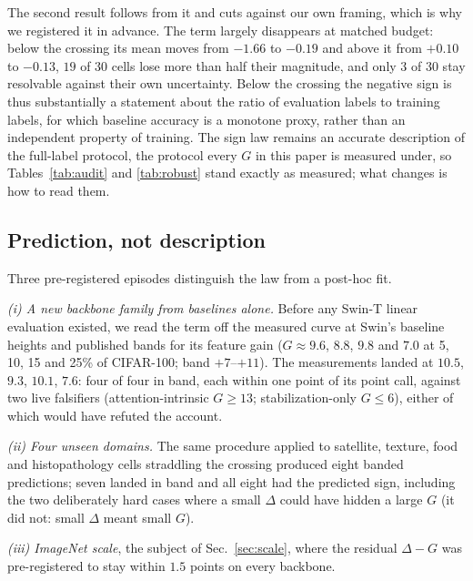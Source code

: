 The second result follows from it and cuts against our own framing, which is
why we registered it in advance. The \readout{} term largely disappears at matched
budget: below the crossing its mean moves from $-1.66$ to $-0.19$ and above it
from $+0.10$ to $-0.13$, $19$ of $30$ cells lose more than half their
magnitude, and only $3$ of $30$ stay resolvable against their own uncertainty.
Below the crossing the negative sign is thus substantially a statement about
the ratio of evaluation labels to training labels, for which baseline accuracy
is a monotone proxy, rather than an independent property of training. The sign
law remains an accurate description of the full-label protocol, the protocol
every $G$ in this paper is measured under, so Tables~\ref{tab:audit} and
\ref{tab:robust} stand exactly as measured; what changes is how to read them.

\subsection{Prediction, not description}\label{sec:lawpredict}
Three pre-registered episodes distinguish the law from a post-hoc fit.

\emph{(i) A new backbone family from baselines alone.} Before any Swin-T linear
evaluation existed, we read the \readout{} term off the measured curve at Swin's
baseline heights and published bands for its feature gain ($G \approx 9.6$,
$8.8$, $9.8$ and $7.0$ at 5, 10, 15 and 25\% of CIFAR-100; band $+7$--$+11$).
The measurements landed at $10.5$, $9.3$, $10.1$, $7.6$: four of four in band,
each within one point of its point call, against two live falsifiers
(attention-intrinsic $G{\geq}13$; stabilization-only $G{\leq}6$), either of
which would have refuted the account.

\emph{(ii) Four unseen domains.} The same procedure applied to satellite,
texture, food and histopathology cells straddling the crossing produced eight
banded predictions; seven landed in band and all eight had the predicted sign,
including the two deliberately hard cases where a small $\Delta$ could have
hidden a large $G$ (it did not: small $\Delta$ meant small $G$).

\emph{(iii) ImageNet scale}, the subject of Sec.~\ref{sec:scale}, where the
residual $\Delta - G$ was pre-registered to stay within $1.5$ points on every
backbone.


